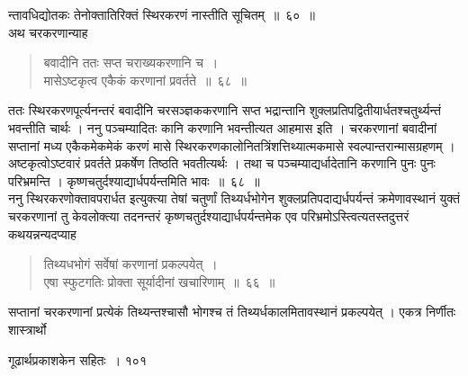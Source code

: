 \documentclass[11pt, openany]{book}
\begin{document}
\noindent न्तावधिद्योतकः तेनोक्तातिरिक्तं स्थिरकरणं नास्तीति सूचितम्~॥~६०~॥\\ अथ चरकरणान्याह\textendash
\begin{quote}

{\ssi  बवादीनि ततः सप्त चराख्यकरणानि च~।\\
मासेऽष्टकृत्व एकैकं करणानां प्रवर्तते~॥~६८~॥}
\end{quote}
\begin{sloppypar}
 ततः स्थिरकरणपूर्त्यनन्तरं बवादीनि चरसञ्ज्ञककरणानि सप्त भद्रान्तानि शुक्लप्रतिपद्वितीयार्धतश्चतुर्थ्यन्तं भवन्तीति चार्थः । ननु पञ्चम्यादितः कानि करणानि भवन्तीत्यत आह\textendash मास इति । चरकरणानां बवादीनां सप्तानां मध्य एकैकमेकमेकं करणं मासे स्थिरकरणकालोनितत्रिंशत्तिथ्यात्मकमासे स्वल्पान्तरान्मासग्रहणम् । अष्टकृत्वोऽष्टवारं प्रवर्तते प्रकर्षेण तिष्ठति भवतीत्यर्थः । तथा च पञ्चम्याद्यर्धादेतानि करणानि पुनः पुनः परिभ्रमन्ति । कृष्णचतुर्दश्याद्यार्धपर्यन्तमिति भावः~॥~६८~॥\\
\noindent ननु स्थिरकरणोक्तावपरार्धत इत्युक्त्या तेषां चतुर्णां तिथ्यर्धभोगेन शुक्लप्रतिपदाद्यर्धपर्यन्तं क्रमेणावस्थानं युक्तं चरकरणानां तु केवलोक्त्या तदनन्तरं कृष्णचतुर्दश्याद्यार्धपर्यन्तमेक एव परिभ्रमोऽस्त्वित्यतस्तदुत्तरं कथयन्नन्यदप्याह\textendash
\end{sloppypar}
\begin{quote}

 {\ssi तिथ्यधभोगं सर्वेषां करणानां प्रकल्पयेत्~।\\
एषा स्फुटगतिः प्रोक्ता सूर्यादीनां खचारिणाम्~॥~६६~॥}
\end{quote}
\begin{sloppypar}
 सप्तानां चरकरणानां प्रत्येकं तिथ्यन्तश्चासौ भोगश्च तं तिथ्यर्धकालमितावस्थानं प्रकल्पयेत् । एकत्र निर्णीतः शास्त्रार्थो\textendash
\end{sloppypar}

\newpage



\hspace{3cm}  गूढार्थप्रकाशकेन सहितः~। \hfill १०१ 
\vspace{1cm}
\end{document}
